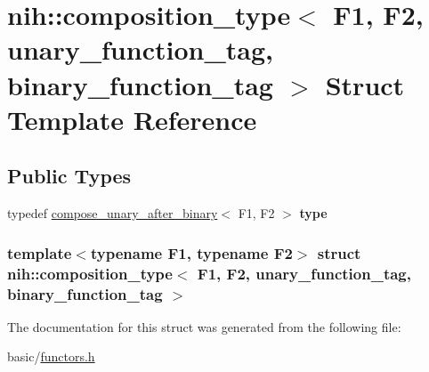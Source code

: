 \hypertarget{structnih_1_1composition__type_3_01_f1_00_01_f2_00_01unary__function__tag_00_01binary__function__tag_01_4}{
\section{nih\-:\-:composition\-\_\-type$<$ \-F1, \-F2, unary\-\_\-function\-\_\-tag, binary\-\_\-function\-\_\-tag $>$ \-Struct \-Template \-Reference}
\label{structnih_1_1composition__type_3_01_f1_00_01_f2_00_01unary__function__tag_00_01binary__function__tag_01_4}
}
\subsection*{\-Public \-Types}
\begin{DoxyCompactItemize}
\item 
\hypertarget{structnih_1_1composition__type_3_01_f1_00_01_f2_00_01unary__function__tag_00_01binary__function__tag_01_4_aa60555af0cb5462e070174c9fd563d00}{
typedef \*
\hyperlink{structnih_1_1compose__unary__after__binary}{compose\-\_\-unary\-\_\-after\-\_\-binary}$<$ \-F1, \*
\-F2 $>$ {\bfseries type}}
\label{structnih_1_1composition__type_3_01_f1_00_01_f2_00_01unary__function__tag_00_01binary__function__tag_01_4_aa60555af0cb5462e070174c9fd563d00}

\end{DoxyCompactItemize}
\subsubsection*{template$<$typename F1, typename F2$>$ struct nih\-::composition\-\_\-type$<$ F1, F2, unary\-\_\-function\-\_\-tag, binary\-\_\-function\-\_\-tag $>$}



\-The documentation for this struct was generated from the following file\-:\begin{DoxyCompactItemize}
\item 
basic/\hyperlink{functors_8h}{functors.\-h}\end{DoxyCompactItemize}
